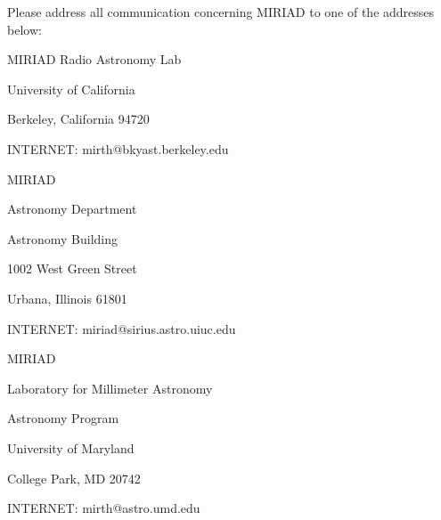 {
Please address all communication concerning MIRIAD to one of
the addresses below: \medskip\par
{\parindent=0.5cm
MIRIAD
Radio Astronomy Lab                     \par
University of California                \par
Berkeley, California  94720             \par
INTERNET:  mirth@bkyast.berkeley.edu    \par
\medskip\par
MIRIAD                                  \par
Astronomy Department                    \par
Astronomy Building                      \par
1002 West Green Street                  \par
Urbana, Illinois  61801                 \par
INTERNET:  miriad@sirius.astro.uiuc.edu \par
\medskip\par
MIRIAD                                  \par
Laboratory for Millimeter Astronomy     \par
Astronomy Program                       \par
University of Maryland                  \par
College Park, MD  20742                 \par
INTERNET:  mirth@astro.umd.edu          \par
}
}
\vfill
\eject
